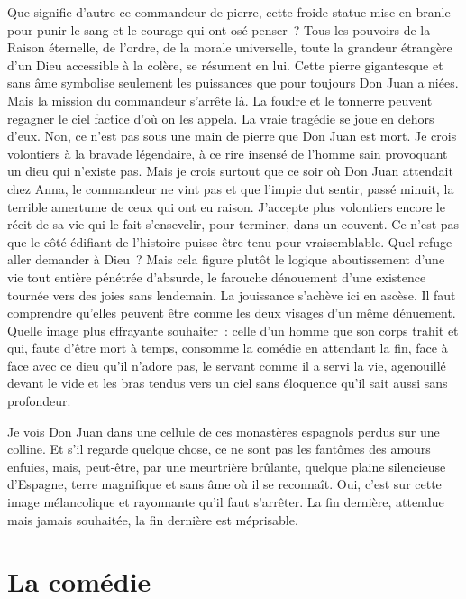 \documentclass{book}
\begin{document}
Que signifie d'autre ce commandeur de pierre, cette froide statue mise en branle pour punir le sang et le courage qui ont osé penser ? Tous les pouvoirs de la Raison éternelle, de l'ordre, de la morale universelle, toute la grandeur étrangère d'un Dieu accessible à la colère, se résument en lui. Cette pierre gigantesque et sans âme symbolise seulement les puissances que pour toujours Don Juan a niées. Mais la mission du commandeur s'arrête là. La foudre et le tonnerre peuvent regagner le ciel factice d'où on les appela. La vraie tragédie se joue en dehors d'eux. Non, ce n'est pas sous une main de pierre que Don Juan est mort. Je crois volontiers à la bravade légendaire, à ce rire insensé de l'homme sain provoquant un dieu qui n'existe pas. Mais je crois surtout que ce soir où Don Juan attendait chez Anna, le commandeur ne vint pas et que l'impie dut sentir, passé minuit, la terrible amertume de ceux qui ont eu raison. J'accepte plus volontiers encore le récit de sa vie qui le fait s'ensevelir, pour terminer, dans un couvent. Ce n'est pas que le côté édifiant de l'histoire puisse être tenu pour vraisemblable. Quel refuge aller demander à Dieu ? Mais cela figure plutôt le logique aboutissement d'une vie tout entière pénétrée d'absurde, le farouche dénouement d'une existence tournée vers des joies sans lendemain. La jouissance s'achève ici en ascèse. Il faut comprendre qu'elles peuvent être comme les deux visages d'un même dénuement. Quelle image plus effrayante souhaiter : celle d'un homme que son corps trahit et qui, faute d'être mort à temps, consomme la comédie en attendant la fin, face à face avec ce dieu qu'il n'adore pas, le servant comme il a servi la vie, agenouillé devant le vide et les bras tendus vers un ciel sans éloquence qu'il sait aussi sans profondeur.

Je vois Don Juan dans une cellule de ces monastères espagnols perdus sur une colline. Et s'il regarde quelque chose, ce ne sont pas les fantômes des amours enfuies, mais, peut‑être, par une meurtrière brûlante, quelque plaine silencieuse d'Espagne, terre magnifique et sans âme où il se reconnaît. Oui, c'est sur cette image mélancolique et rayonnante qu'il faut s'arrêter. La fin dernière, attendue mais jamais souhaitée, la fin dernière est méprisable.

\section{La comédie}
\end{document}
